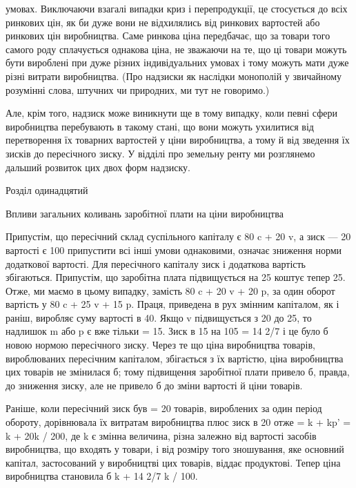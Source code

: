 умовах. Виключаючи взагалі випадки криз і перепродукції, це
стосується до всіх ринкових цін, як би дуже вони не відхилялись
від ринкових вартостей або ринкових цін виробництва.
Саме ринкова ціна передбачає, що за товари того самого роду
сплачується однакова ціна, не зважаючи на те, що ці товари
можуть бути вироблені при дуже різних індивідуальних умовах
і тому можуть мати дуже різні витрати виробництва. (Про надзиски
як наслідки монополій у звичайному розумінні слова, штучних
чи природних, ми тут не говоримо.)

Але, крім того, надзиск може виникнути ще в тому випадку,
коли певні сфери виробництва перебувають в такому стані, що
вони можуть ухилитися від перетворення їх товарних вартостей
у ціни виробництва, а тому й від зведення їх зисків до пересічного
зиску. У відділі про земельну ренту ми розглянемо
дальший розвиток цих двох форм надзиску.

Розділ одинадцятий

Впливи загальних коливань заробітної плати
на ціни виробництва

Припустім, що пересічний склад суспільного капіталу є
80 c + 20 v, а зиск — 20%
вартості є 100%
припустити всі інші умови однаковими, означає зниження норми
додаткової вартості. Для пересічного капіталу зиск і додаткова
вартість збігаються. Припустім, що заробітна плата підвищується
на 25%
коштує тепер 25. Отже, ми маємо в цьому випадку, замість
80 c + 20 v + 20 p, за один оборот вартість у 80 c + 25 v + 15 p.
Праця, приведена в рух змінним капіталом, як і раніш, виробляє
суму вартості в 40. Якщо v підвищується з 20 до 25, то надлишок
m або p є вже тільки = 15. Зиск в 15 на 105 = 14 2/7%
і це було б новою нормою пересічного зиску. Через те що
ціна виробництва товарів, вироблюваних пересічним капіталом,
збігається з їх вартістю, ціна виробництва цих товарів не змінилася
б; тому підвищення заробітної плати привело б, правда,
до зниження зиску, але не привело б до зміни вартості й ціни
товарів.

Раніше, коли пересічний зиск був = 20%
товарів, вироблених за один період обороту, дорівнювала їх
витратам виробництва плюс зиск в 20%
отже = k + kp' = k + 20k / 200, де k є змінна величина, різна
залежно від вартості засобів виробництва, що входять у товари,
і від розміру того зношування, яке основний капітал, застосований
у виробництві цих товарів, віддає продуктові. Тепер
ціна виробництва становила б k + 14 2/7 k / 100.

